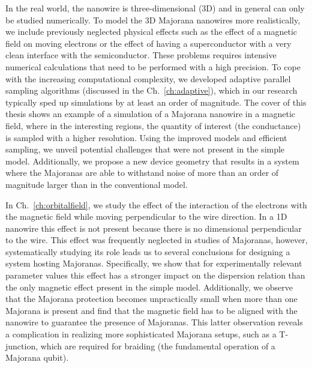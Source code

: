 In the real world, the nanowire is three-dimensional (3D) and in general can only be studied numerically.
To model the 3D Majorana nanowires more realistically, we include previously neglected physical effects such as the effect of a magnetic field on moving electrons or the effect of having a superconductor with a very clean interface with the semiconductor.
These problems requires intensive numerical calculations that need to be performed with a high precision.
To cope with the increasing computational complexity, we developed adaptive parallel sampling algorithms (discussed in the Ch.~\ref{ch:adaptive}), which in our research typically sped up simulations by at least an order of magnitude.
The cover of this thesis shows an example of a simulation of a Majorana nanowire in a magnetic field, where in the interesting regions, the quantity of interest (the conductance) is sampled with a higher resolution.
Using the improved models and efficient sampling, we unveil potential challenges that were not present in the simple model.
Additionally, we propose a new device geometry that results in a system where the Majoranas are able to withstand noise of more than an order of magnitude larger than in the conventional model.

In Ch.~\ref{ch:orbitalfield}, we study the effect of the interaction of the electrons with the magnetic field while moving perpendicular to the wire direction.
In a 1D nanowire this effect is not present because there is no dimensional perpendicular to the wire.
This effect was frequently neglected in studies of Majoranas, however, systematically studying its role leads us to several conclusions for designing a system hosting Majoranas.
Specifically, we show that for experimentally relevant parameter values this effect has a stronger impact on the dispersion relation than the only magnetic effect present in the simple model.
Additionally, we observe that the Majorana protection becomes unpractically small when more than one Majorana is present and find that the magnetic field has to be aligned with the nanowire to guarantee the presence of Majoranas.
This latter observation reveals a complication in realizing more sophisticated Majorana setups, such as a T-junction, which are required for braiding (the fundamental operation of a Majorana qubit).

